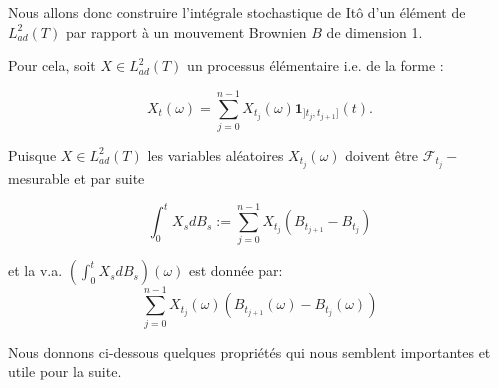\documentclass[A4paper,12pt]{report}
\begin{document}
Nous allons donc construire l'intégrale stochastique de Itô d'un élément de $L_{a d}^{2}(T)$ par rapport à un mouvement Brownien $B$ de dimension 1.

Pour cela, soit $X \in L_{a d}^{2}(T)$ un processus élémentaire i.e. de la forme :

$$
 X_t(\omega)=\sum_{j=0}^{n-1} X_{t_{j}}(\omega) \mathbf{1}_{]t_{j}, t_{j+1}]}(t) .
$$

Puisque $X \in L_{a d}^{2}(T)$ les variables aléatoires $X_{t_{j}}(\omega)$ doivent être $\mathcal{F}_{t_{j}}-$ mesurable et par suite

$$
\int_{0}^{t} X_s d B_{s}:=\sum_{j=0}^{n-1} X_{t_{j}}\left(B_{t_{j+1} }-B_{t_{j} }\right) 
$$

et la v.a. $\left(\int_{0}^{t} X_s d B_{s}\right)(\omega)$ est donnée par: $$ \sum_{j=0}^{n-1} X_{t_{j}}(\omega)\left(B_{t_{j+1}}(\omega)-B_{t_{j}}(\omega)\right)$$

Nous donnons ci-dessous quelques propriétés qui nous semblent importantes et utile pour la suite.
\end{document}
